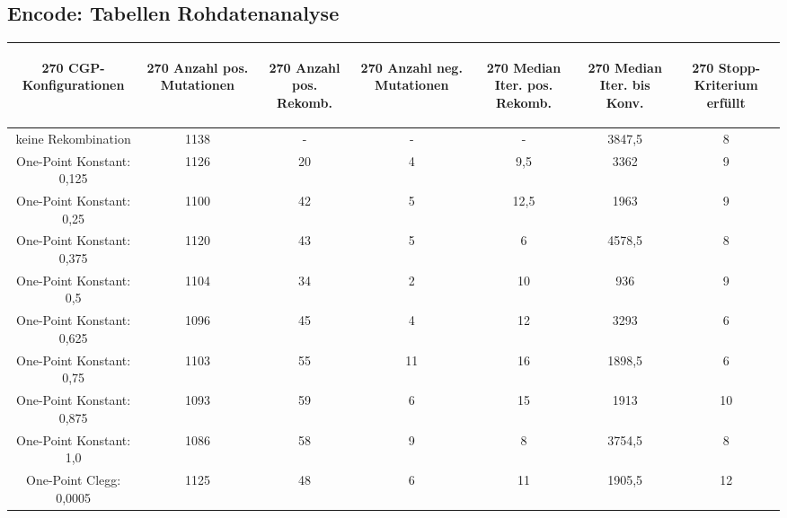 \subsection{Encode: Tabellen Rohdatenanalyse}
\label{subsec:appendix:TabellenReohdatenanalyseEncode}

\begin{table}[H]
	\centering
	\begin{tabular}{c | c | c | c | c | c | c}
		\begin{turn}{270} \textbf{CGP-Konfigurationen} \end{turn} & \begin{turn}{270} \textbf{Anzahl pos. Mutationen} \end{turn} & \begin{turn}{270} \textbf{Anzahl pos. Rekomb.} \end{turn} & \begin{turn}{270} \textbf{Anzahl neg. Mutationen} \end{turn} & \begin{turn}{270} \textbf{Median Iter. pos. Rekomb.} \end{turn} & \begin{turn}{270} \textbf{Median Iter. bis Konv.} \end{turn} & \begin{turn}{270} \textbf{Stopp-Kriterium erfüllt} \end{turn}\\
		\hline
		keine Rekombination & 1138 & - & - & - & 3847,5 & 8\\
		\hline
		One-Point Konstant: 0,125 & 1126 & 20 & 4 & 9,5 & 3362 & 9\\
		\hline
		One-Point Konstant: 0,25 & 1100 & 42 & 5 & 12,5 & 1963 & 9\\
		\hline
		One-Point Konstant: 0,375 & 1120 & 43 & 5 & 6 & 4578,5 & 8\\
		\hline
		One-Point Konstant: 0,5 & 1104 & 34 & 2 & 10 & 936 & 9\\
		\hline
		One-Point Konstant: 0,625 & 1096 & 45 & 4 & 12 & 3293 & 6\\
		\hline
		One-Point Konstant: 0,75 & 1103 & 55 & 11 & 16 & 1898,5 & 6\\
		\hline
		One-Point Konstant: 0,875 & 1093 & 59 & 6 & 15 & 1913 & 10\\
		\hline
		One-Point Konstant: 1,0 & 1086 & 58 & 9 & 8 & 3754,5 & 8\\
		\hline
		One-Point Clegg: 0,0005 & 1125 & 48 & 6 & 11 & 1905,5 & 12\\

\end{tabular}
\end{table}
